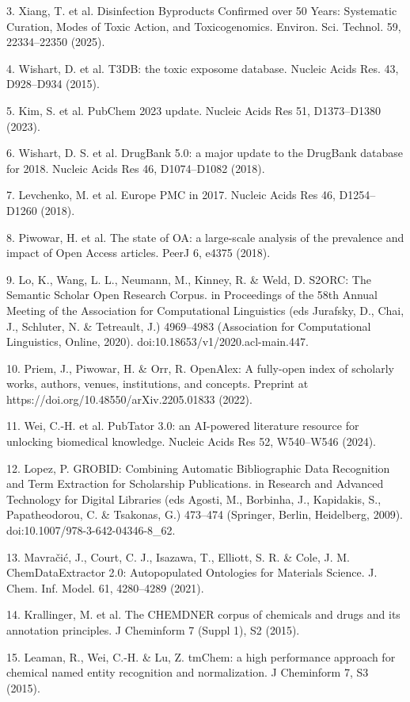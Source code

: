 \documentclass[
]{article}
\begin{document}
3. Xiang, T. et al. Disinfection Byproducts Confirmed over 50 Years: Systematic Curation, Modes of Toxic Action, and Toxicogenomics. Environ. Sci. Technol. 59, 22334--22350 (2025).

4. Wishart, D. et al. T3DB: the toxic exposome database. Nucleic Acids Res. 43, D928--D934 (2015).

5. Kim, S. et al. PubChem 2023 update. Nucleic Acids Res 51, D1373--D1380 (2023).

6. Wishart, D. S. et al. DrugBank 5.0: a major update to the DrugBank database for 2018. Nucleic Acids Res 46, D1074--D1082 (2018).

7. Levchenko, M. et al. Europe PMC in 2017. Nucleic Acids Res 46, D1254--D1260 (2018).

8. Piwowar, H. et al. The state of OA: a large-scale analysis of the prevalence and impact of Open Access articles. PeerJ 6, e4375 (2018).

9. Lo, K., Wang, L. L., Neumann, M., Kinney, R. \& Weld, D. S2ORC: The Semantic Scholar Open Research Corpus. in Proceedings of the 58th Annual Meeting of the Association for Computational Linguistics (eds Jurafsky, D., Chai, J., Schluter, N. \& Tetreault, J.) 4969--4983 (Association for Computational Linguistics, Online, 2020). doi:10.18653/v1/2020.acl-main.447.

10. Priem, J., Piwowar, H. \& Orr, R. OpenAlex: A fully-open index of scholarly works, authors, venues, institutions, and concepts. Preprint at https://doi.org/10.48550/arXiv.2205.01833 (2022).

11. Wei, C.-H. et al. PubTator 3.0: an AI-powered literature resource for unlocking biomedical knowledge. Nucleic Acids Res 52, W540--W546 (2024).

12. Lopez, P. GROBID: Combining Automatic Bibliographic Data Recognition and Term Extraction for Scholarship Publications. in Research and Advanced Technology for Digital Libraries (eds Agosti, M., Borbinha, J., Kapidakis, S., Papatheodorou, C. \& Tsakonas, G.) 473--474 (Springer, Berlin, Heidelberg, 2009). doi:10.1007/978-3-642-04346-8\_62.

13. Mavračić, J., Court, C. J., Isazawa, T., Elliott, S. R. \& Cole, J. M. ChemDataExtractor 2.0: Autopopulated Ontologies for Materials Science. J. Chem. Inf. Model. 61, 4280--4289 (2021).

14. Krallinger, M. et al. The CHEMDNER corpus of chemicals and drugs and its annotation principles. J Cheminform 7 (Suppl 1), S2 (2015).

15. Leaman, R., Wei, C.-H. \& Lu, Z. tmChem: a high performance approach for chemical named entity recognition and normalization. J Cheminform 7, S3 (2015).
\end{document}
